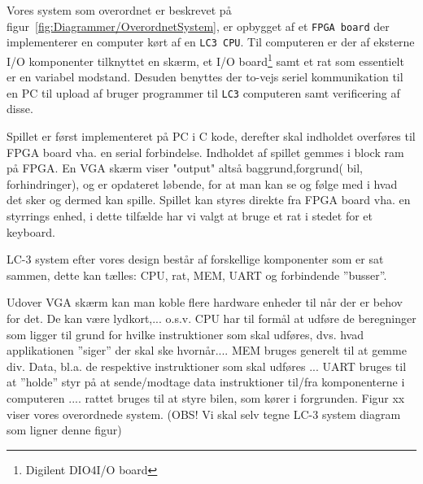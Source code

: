 Vores system som overordnet er beskrevet på figur~\vref{fig:Diagrammer/OverordnetSystem}, er opbygget af et \texttt{FPGA board} der implementerer en computer kørt af en \texttt{LC3 CPU}. Til computeren er der af eksterne I/O komponenter tilknyttet en skærm, et I/O board\footnote{Digilent DIO4\texttrademark I/O board} samt et rat som essentielt er en variabel modstand. Desuden benyttes der to-vejs seriel kommunikation til en PC til upload af bruger programmer til \texttt{LC3} computeren samt verificering af disse.


Spillet er først implementeret på PC i C kode, derefter skal indholdet overføres til FPGA board vha. en serial forbindelse. Indholdet af spillet gemmes i block ram på FPGA. En VGA skærm viser "output" altså baggrund,forgrund( bil, forhindringer), og er opdateret løbende, for at man kan se og følge med i hvad det sker og dermed kan spille. Spillet kan styres direkte fra FPGA board vha. en styrrings enhed, i dette tilfælde har vi valgt at bruge et rat i stedet for et keyboard.

LC-3 system efter vores design består af forskellige komponenter som er sat sammen, dette kan tælles: CPU, rat, MEM, UART og forbindende ”busser”.

Udover VGA skærm kan man koble flere hardware enheder til når der er behov for det. De kan være lydkort,... o.s.v.
CPU har til formål at udføre de beregninger som ligger til grund for hvilke instruktioner som skal udføres, dvs. hvad applikationen ”siger” der skal ske hvornår....
MEM bruges generelt til at gemme div. Data, bl.a. de respektive instruktioner som skal udføres ...
UART bruges til at ”holde” styr på at sende/modtage data instruktioner til/fra komponenterne i computeren ....
rattet bruges til at styre bilen, som kører i forgrunden.
Figur xx viser vores overordnede system.
(OBS! Vi skal selv tegne LC-3 system diagram som ligner denne figur)